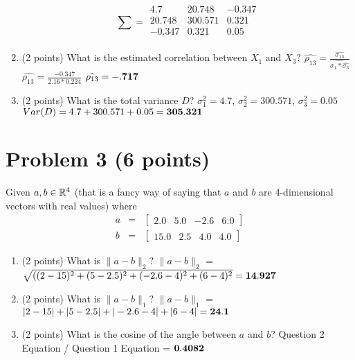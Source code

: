 \documentclass[11pt]{article}
\begin{document}
\begin{enumerate}
    $$
    \sum = \begin{matrix}
            
         4.7  & 20.748  & -0.347 \\
         20.748  &  300.571  & 0.321 \\
         -0.347  &  0.321    & 0.05 \\
    \end{matrix}
$$
    
    \item (2 points) What is the estimated correlation between $X_1$ and $X_3$?
    \newline
    \newline $\hat{\rho_{13}} = \frac{\hat{\sigma_{13}}}{\hat{\sigma_{1} * \hat{\sigma_{3}}}}$
    \newline $\hat{\rho_{13}} = \frac{-0.347}{2.16 * 0.224}$
    \newline $\hat{\rho_{13}} =  \bf{-.717}$
    \item (2 points) What is the total variance $D$?
    \newline
    \newline $\sigma^2_1 = 4.7$, $\sigma^2_2 = 300.571$, $\sigma^2_3 = 0.05$
    \newline $Var(D) = 4.7 + 300.571 + 0.05 = \bf{305.321}$
\end{enumerate}

\section*{Problem 3 (6 points)}

Given $a, b \in \mathbb{R}^4$ (that is a fancy way of saying that $a$ and $b$ are
4-dimensional vectors with real values) where
\begin{eqnarray*}
    a &=& \begin{bmatrix} 2.0  & 5.0 & -2.6 & 6.0 \end{bmatrix} \\
    b &=& \begin{bmatrix} 15.0 & 2.5 &  4.0 & 4.0 \end{bmatrix}
\end{eqnarray*}

\begin{enumerate}
    \item (2 points) What is $\|a-b\|_2$?
    \newline
    \newline $\|a-b\|_2$ = $\sqrt{((2-15)^2 + (5-2.5)^2 + (-2.6-4)^2 + (6-4)^2} = \bf{14.927}$
    \item (2 points) What is $\|a-b\|_1$?
    \newline
    \newline$\|a-b\|_1$ = $|2-15| + |5-2.5| + |-2.6-4| + |6-4| = \bf{24.1}$
    \item (2 points) What is the cosine of the angle between $a$ and $b$?
    \newline
    \newline Question 2 Equation / Question 1 Equation = $\bf{0.4082}$
\end{enumerate}
\end{document}

